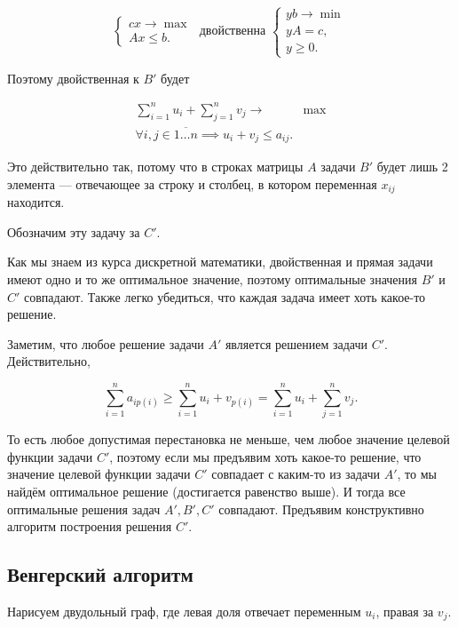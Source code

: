 \[
  \begin{cases}
    cx \to \max\\
    Ax \leqslant b.
  \end{cases}
  \text{ двойственна }
  \begin{cases}
    yb \to \min\\
    yA = c,\\
    y \geqslant 0.
  \end{cases}
\]

Поэтому двойственная к $B'$ будет

\begin{align*}
  \sum\limits_{i = 1}^n u_i + \sum\limits_{j = 1}^n v_j \to &\max\\
  \forall i, j \in \overline{1\ldots n} \implies u_i + v_j \leqslant a_{ij}.
\end{align*}

Это действительно так, потому что в строках матрицы $A$ задачи $B'$ будет лишь
2 элемента --- отвечающее за строку и столбец, в котором переменная $x_{ij}$
находится.

Обозначим эту задачу за $C'$.

Как мы знаем из курса дискретной математики, двойственная и прямая задачи
имеют одно и то же оптимальное значение, поэтому оптимальные значения $B'$ и $C'$
совпадают. Также легко убедиться, что каждая задача имеет хоть какое-то
решение.

Заметим, что любое решение задачи $A'$ является решением задачи $C'$. Действительно,

\begin{equation}\label{main}
  \sum\limits_{i = 1}^n a_{ip(i)} \geqslant \sum\limits_{i = 1}^n u_i + v_{p(i)} =
  \sum\limits_{i = 1}^n u_i + \sum\limits_{j = 1}^n v_j.
\end{equation}

То есть любое допустимая перестановка не меньше, чем любое значение целевой
функции задачи $C'$, поэтому если мы предъявим хоть какое-то решение, что 
значение целевой функции задачи $C'$ совпадает с каким-то из задачи $A'$, то мы найдём
оптимальное решение (достигается равенство выше). И тогда все оптимальные решения
задач $A', B', C'$ совпадают. Предъявим конструктивно алгоритм построения решения
$C'$.

\subsection{Венгерский алгоритм}

Нарисуем двудольный граф, где левая доля отвечает переменным $u_i$, правая
за $v_j$. 

